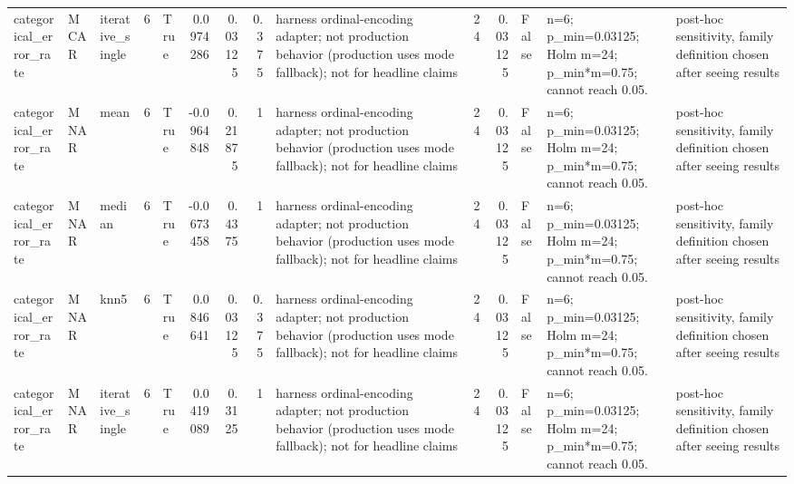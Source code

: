 \begin{table}[ht]
\begin{tabular}{lllrlrrrlrrlll}
 categorical\_error\_rate & MCAR        & iterative\_single &            6 & True                &       0.0974286  & 0.03125    & 0.375     & harness ordinal-encoding adapter; not production behavior (production uses mode fallback); not for headline claims &                             24 &                         0.03125    & False                       & n=6; p\_min=0.03125; Holm m=24; p\_min*m=0.75; cannot reach 0.05.  & post-hoc sensitivity, family definition chosen after seeing results \\
 categorical\_error\_rate & MNAR        & mean             &            6 & True                &      -0.0964848  & 0.21875    & 1         & harness ordinal-encoding adapter; not production behavior (production uses mode fallback); not for headline claims &                             24 &                         0.03125    & False                       & n=6; p\_min=0.03125; Holm m=24; p\_min*m=0.75; cannot reach 0.05.  & post-hoc sensitivity, family definition chosen after seeing results \\
 categorical\_error\_rate & MNAR        & median           &            6 & True                &      -0.0673458  & 0.4375     & 1         & harness ordinal-encoding adapter; not production behavior (production uses mode fallback); not for headline claims &                             24 &                         0.03125    & False                       & n=6; p\_min=0.03125; Holm m=24; p\_min*m=0.75; cannot reach 0.05.  & post-hoc sensitivity, family definition chosen after seeing results \\
 categorical\_error\_rate & MNAR        & knn5             &            6 & True                &       0.0846641  & 0.03125    & 0.375     & harness ordinal-encoding adapter; not production behavior (production uses mode fallback); not for headline claims &                             24 &                         0.03125    & False                       & n=6; p\_min=0.03125; Holm m=24; p\_min*m=0.75; cannot reach 0.05.  & post-hoc sensitivity, family definition chosen after seeing results \\
 categorical\_error\_rate & MNAR        & iterative\_single &            6 & True                &       0.0419089  & 0.3125     & 1         & harness ordinal-encoding adapter; not production behavior (production uses mode fallback); not for headline claims &                             24 &                         0.03125    & False                       & n=6; p\_min=0.03125; Holm m=24; p\_min*m=0.75; cannot reach 0.05.  & post-hoc sensitivity, family definition chosen after seeing results \\
\hline
\end{tabular}
\end{table}
